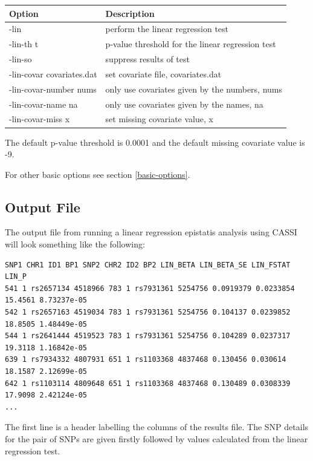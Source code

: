 \documentclass[a4paper,12pt]{article}
\begin{document}
{\begin{center}\begin{tabular}{ll}
Option  & Description\\
\hline
-lin  & perform the linear regression test\\
-lin-th t  & p-value threshold for the linear regression test\\
-lin-so  & suppress results of test\\
-lin-covar covariates.dat  & set covariate file, covariates.dat\\
-lin-covar-number nums  & only use covariates given by the numbers, nums\\
-lin-covar-name na  & only use covariates given by the names, na\\
-lin-covar-miss x  & set missing covariate value, x\\
\end{tabular}\end{center}}

The default p-value threshold is 0.0001 and the default missing covariate value is -9. 

For other basic options see  section \ref{basic-options}. 


\subsection{Output File}
\label{lin-output}

The output file from running a linear regression epistatis analysis using CASSI will look something like the following: 
\vspace{0.35cm} \begin{lstlisting}
SNP1 CHR1 ID1 BP1 SNP2 CHR2 ID2 BP2 LIN_BETA LIN_BETA_SE LIN_FSTAT LIN_P
541 1 rs2657134 4518966 783 1 rs7931361 5254756 0.0919379 0.0233854 15.4561 8.73237e-05
542 1 rs2657163 4519034 783 1 rs7931361 5254756 0.104137 0.0239852 18.8505 1.48449e-05
544 1 rs2641444 4519523 783 1 rs7931361 5254756 0.104289 0.0237317 19.3118 1.16842e-05
639 1 rs7934332 4807931 651 1 rs1103368 4837468 0.130456 0.030614 18.1587 2.12699e-05
642 1 rs1103114 4809648 651 1 rs1103368 4837468 0.130489 0.0308339 17.9098 2.42124e-05
... 

\end{lstlisting} \vspace{0.35cm}
The first line is a header labelling the columns of the results file. The SNP details for the pair of SNPs are given firstly followed by values calculated from the linear regression test. 
\end{document}
